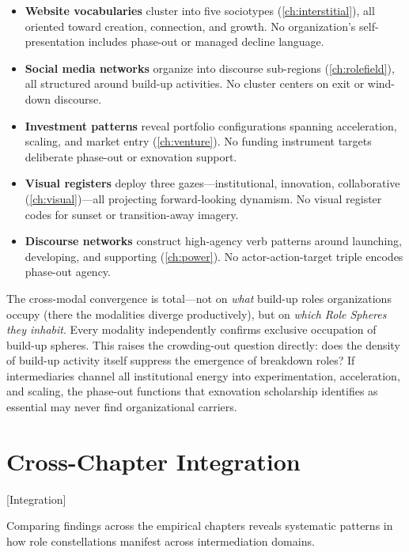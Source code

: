 \documentclass[../main.tex]{subfiles}
\begin{document}
\begin{itemize}[leftmargin=*, itemsep=0.3em]
\item \textbf{Website vocabularies} cluster into five sociotypes (\cref{ch:interstitial}), all oriented toward creation, connection, and growth. No organization's self-presentation includes phase-out or managed decline language.
\item \textbf{Social media networks} organize into discourse sub-regions (\cref{ch:rolefield}), all structured around build-up activities. No cluster centers on exit or wind-down discourse.
\item \textbf{Investment patterns} reveal portfolio configurations spanning acceleration, scaling, and market entry (\cref{ch:venture}). No funding instrument targets deliberate phase-out or exnovation support.
\item \textbf{Visual registers} deploy three gazes---institutional, innovation, collaborative (\cref{ch:visual})---all projecting forward-looking dynamism. No visual register codes for sunset or transition-away imagery.
\item \textbf{Discourse networks} construct high-agency verb patterns around launching, developing, and supporting (\cref{ch:power}). No actor-action-target triple encodes phase-out agency.
\end{itemize}

The cross-modal convergence is total---not on \textit{what} build-up roles organizations occupy (there the modalities diverge productively), but on \textit{which Role Spheres they inhabit}. Every modality independently confirms exclusive occupation of build-up spheres. This raises the crowding-out question directly: does the density of build-up activity itself suppress the emergence of breakdown roles? If intermediaries channel all institutional energy into experimentation, acceleration, and scaling, the phase-out functions that exnovation scholarship identifies as essential \parencite{david2017exnovation,davidson2019exnovating} may never find organizational carriers.

\section{Cross-Chapter Integration}[Integration]

Comparing findings across the empirical chapters reveals systematic patterns in how role constellations manifest across intermediation domains.
\end{document}
